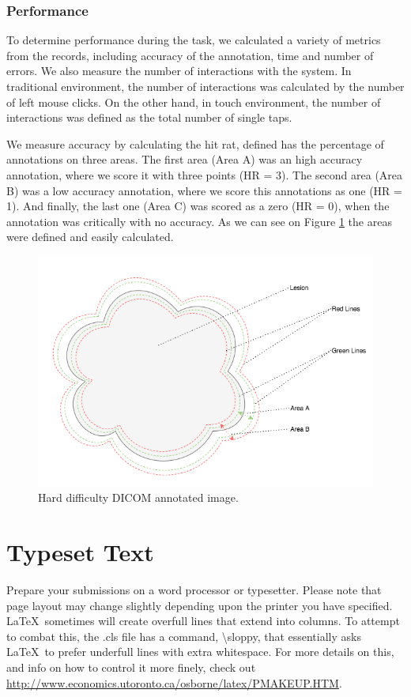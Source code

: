 \documentclass{sigchi}
\begin{document}
\subsubsection{Performance}

To determine performance during the task, we calculated a variety of metrics from the records, including accuracy of the annotation, time and number of errors. We also measure the number of interactions with the system. In traditional environment, the number of interactions was calculated by the number of left mouse clicks. On the other hand, in touch environment, the number of interactions was defined as the total number of single taps.

We measure accuracy by calculating the hit rat, defined has the percentage of annotations on three areas. The first area (Area A) was an high accuracy annotation, where we score it with three points (HR = 3). The second area (Area B) was a low accuracy annotation, where we score this annotations as one (HR = 1). And finally, the last one (Area C) was scored as a zero (HR = 0), when the annotation was critically with no accuracy. As we can see on Figure \ref{} the areas were defined and easily calculated.

\begin{figure}[!h]
\centering
\includegraphics[width=0.9\columnwidth]{mimbcd-ui_areas}
\caption{Hard difficulty DICOM annotated image.}
\label{fig:fig6}
\end{figure}

\section{Typeset Text}

Prepare your submissions on a word processor or typesetter.  Please
note that page layout may change slightly depending upon the printer
you have specified.  \LaTeX\ sometimes will create overfull lines
that extend into columns.  To attempt to combat this, the .cls
file has a command, {\textbackslash}sloppy, that essentially asks
\LaTeX\ to prefer underfull lines with extra whitespace.  For more
details on this, and info on how to control it more finely, check out
{\url{http://www.economics.utoronto.ca/osborne/latex/PMAKEUP.HTM}}.
\end{document}
